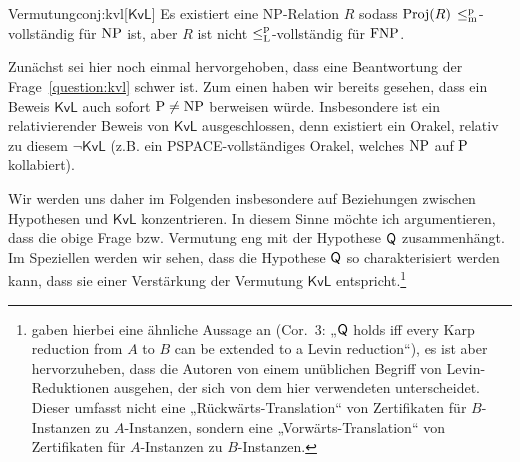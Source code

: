 \begin{reptheorem}{Vermutung}{conj:kvl}[$\mathsf{KvL}$]
    Es existiert eine NP-Relation $R$ sodass $\Proj(R)$ $\leqmp$-vollständig für $\NP$ ist, aber $R$ ist nicht $\leqlp$-vollständig für $\FNP$.
\end{reptheorem}

Zunächst sei hier noch einmal hervorgehoben, dass eine Beantwortung der Frage~\ref{question:kvl} schwer ist. Zum einen haben wir bereits gesehen, dass ein Beweis $\mathsf{KvL}$ auch sofort $\P\neq\NP$ berweisen würde. Insbesondere ist ein relativierender Beweis von $\mathsf{KvL}$ ausgeschlossen, denn existiert ein Orakel, relativ zu diesem $\neg\mathsf{KvL}$ (z.B. ein PSPACE-vollständiges Orakel, welches $\NP$ auf $\P$ kollabiert).

Wir werden uns daher im Folgenden insbesondere auf Beziehungen zwischen Hypothesen und $\mathsf{KvL}$ konzentrieren.
In diesem Sinne möchte ich argumentieren, dass die obige Frage bzw. Vermutung eng mit der Hypothese $\hQ$ zusammenhängt.
Im Speziellen werden wir sehen, dass die Hypothese $\hQ$ so charakterisiert werden kann, dass sie einer Verstärkung der Vermutung $\mathsf{KvL}$ entspricht.\footnote{\textcite{fenner_inverting_2003} gaben hierbei eine ähnliche Aussage an (Cor.~3: „$\hQ$ holds iff every Karp reduction from $A$ to $B$ can be extended to a Levin reduction“), es ist aber hervorzuheben, dass die Autoren von einem unüblichen Begriff von Levin-Reduktionen ausgehen, der sich von dem hier verwendeten unterscheidet. Dieser umfasst nicht eine „Rückwärts-Translation“ von Zertifikaten für $B$-Instanzen zu $A$-Instanzen, sondern eine „Vorwärts-Translation“ von Zertifikaten für $A$-Instanzen zu $B$-Instanzen.}

